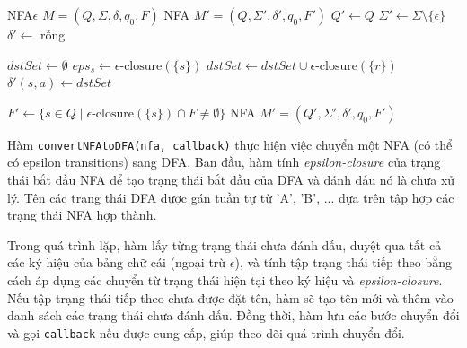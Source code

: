 \documentclass[12pt,a4paper]{report}
\begin{document}
\begin{algorithm}[H]
\caption{Chuyển NFA$\epsilon$ sang NFA}
\begin{algorithmic}[1]
\Require NFA$\epsilon$ $M = (Q, \Sigma, \delta, q_0, F)$
\Ensure NFA $M' = (Q, \Sigma', \delta', q_0, F')$
\State $Q' \gets Q$
\State $\Sigma' \gets \Sigma \setminus \{\epsilon\}$
\State $\delta' \gets$ rỗng

        \State $dstSet \gets \emptyset$
        \State $eps_s \gets \epsilon\text{-closure}(\{s\})$
                    \State $dstSet \gets dstSet \cup \epsilon\text{-closure}(\{r\})$
                \EndFor
            \EndIf
        \EndFor
            \State $\delta'(s, a) \gets dstSet$
        \EndIf
    \EndFor
\EndFor

\State $F' \gets \{ s \in Q \mid \epsilon\text{-closure}(\{s\}) \cap F \neq \emptyset \}$
\State \Return NFA $M' = (Q', \Sigma', \delta', q_0, F')$
\end{algorithmic}
\end{algorithm}



Hàm \texttt{convertNFAtoDFA(nfa, callback)} thực hiện việc chuyển một NFA (có thể có epsilon transitions) sang DFA. Ban đầu, hàm tính \emph{epsilon-closure} của trạng thái bắt đầu NFA để tạo trạng thái bắt đầu của DFA và đánh dấu nó là chưa xử lý. Tên các trạng thái DFA được gán tuần tự từ 'A', 'B', ... dựa trên tập hợp các trạng thái NFA hợp thành.

Trong quá trình lặp, hàm lấy từng trạng thái chưa đánh dấu, duyệt qua tất cả các ký hiệu của bảng chữ cái (ngoại trừ \(\epsilon\)), và tính tập trạng thái tiếp theo bằng cách áp dụng các chuyển từ trạng thái hiện tại theo ký hiệu và \emph{epsilon-closure}. Nếu tập trạng thái tiếp theo chưa được đặt tên, hàm sẽ tạo tên mới và thêm vào danh sách các trạng thái chưa đánh dấu. Đồng thời, hàm lưu các bước chuyển đổi và gọi \texttt{callback} nếu được cung cấp, giúp theo dõi quá trình chuyển đổi.
\end{document}
